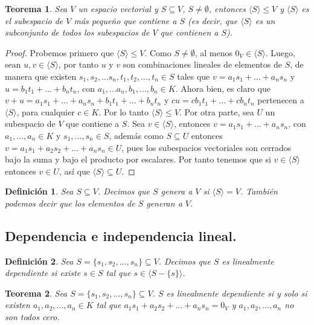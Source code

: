 \documentclass{book}
\newtheorem{theorem}{Teorema}
\newtheorem{definition}{Definición}
\begin{document}
\begin{theorem}
Sea $V$ un espacio vectorial y $S \subseteq V$, $S \neq \emptyset$, entonces $\langle S \rangle \leq V$ y $\langle S \rangle$ es el subespacio de $V$ más pequeño que contiene a $S$ (es decir, que $\langle S \rangle$ es un subconjunto de todos los subespacios de $V$ que contienen a $S$).
\end{theorem}
\begin{proof}
Probemos primero que $\langle S \rangle \leq V$. Como $S \neq \emptyset$, al menos $0_V \in \langle S \rangle$. Luego, sean $u,v \in \langle S \rangle$, por tanto $u$ y $v$ son combinaciones lineales de elementos de $S$, de manera que existen $s_1,s_2,...s_n,t_1,t_2,...,t_n \in S$ tales que $v=a_1s_1+...+a_ns_n$ y $u=b_1t_1+...+b_nt_n$, con $a_1,...a_n,b_1,...,b_n \in K$. Ahora bien, es claro que $v+u=a_1s_1+...+a_ns_n+b_1t_1+...+b_nt_n$ y $cu=cb_1t_1+...+cb_nt_n$ pertenecen a $\langle S \rangle$, para cualquier $c \in K$. Por lo tanto $\langle S \rangle \leq V$.\newline \newline
Por otra parte, sea $U$ un subespacio de $V$ que contiene a $S$. Sea $v \in \langle S \rangle$, entonces $v=a_1s_1+...+a_ns_n$, con $a_1,...,a_n \in K$ y $s_1,...,s_n \in S$, además como $S \subseteq U$ entonces $v=a_1s_1+a_2s_2+...+a_ns_n \in U$, pues los subespacios vectoriales son cerrados bajo la suma y bajo el producto por escalares. Por tanto tenemos que si $v \in \langle S \rangle$ entonces $v \in U$, así que $\langle S \rangle \subseteq U$.
\end{proof}

\begin{definition}
Sea $S \subseteq V$. Decimos que $S$ genera a $V$ si $\langle S \rangle = V$. También podemos decir que los elementos de $S$ generan a $V$.
\end{definition}

\subsection{Dependencia e independencia lineal.}

\begin{definition}
Sea $S=\{s_1,s_2,...,s_n\}\subseteq V$. Decimos que $S$ es linealmente dependiente si existe $s \in S$ tal que $s \in \langle S-\{s\} \rangle$.
\end{definition}

\begin{theorem}
Sea $S=\{s_1,s_2,...,s_n\}\subseteq V$. $S$ es linealmente dependiente si y solo si existen $a_1,a_2,...,a_n \in K$ tal que $a_1s_1+a_2s_2+...+a_ns_n=0_V$ y $a_1,a_2,...,a_n $ no son todos cero.
\end{theorem}
\end{document}
